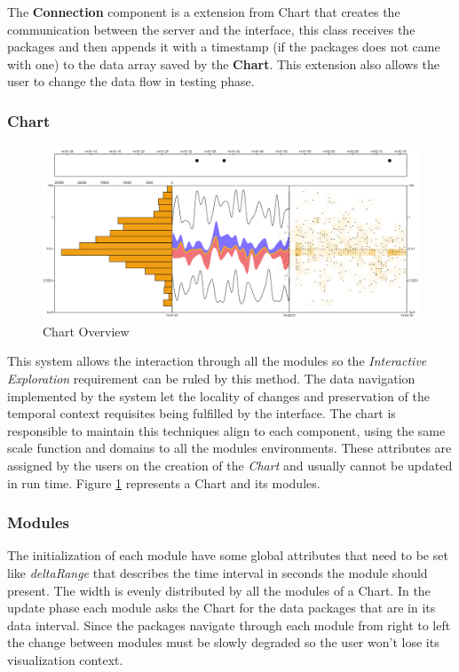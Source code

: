 \documentclass[letterpaper, 10 pt, conference]{ieeeconf}  %
\begin{document}
The \textbf{Connection} component is a extension from Chart that creates the communication between the server and the interface, this class receives the packages and then appends it with a timestamp (if the packages does not came with one) to the data array saved by the \textbf{Chart}. This extension also allows the user to change the data flow in testing phase.



\subsubsection{Chart}
\label{subsubsection:chart}

\begin{figure}[ht]
    \centering
  \includegraphics[width=\linewidth]{Figures/chart.png}
  \caption{Chart Overview}
  \label{fig:chart}
\end{figure}

This system allows the interaction through all the modules so the \textit{Interactive Exploration} requirement can be ruled by this method. The data navigation implemented by the system let the locality of changes and preservation of the temporal context requisites being fulfilled by the interface.\newline
The chart is responsible to maintain this techniques align to each component, using the same scale function and domains to all the modules environments. These attributes are assigned by the users on the creation of the \textit{Chart} and usually cannot be updated in run time. Figure \ref{fig:chart} represents a Chart and its modules.

\subsubsection{Modules}
\label{subsubsection:modules}
The initialization of each module have some global attributes that need to be set like \textit{deltaRange} that describes the time interval in seconds the module should present. The width is evenly distributed by all the modules of a Chart. In the update phase each module asks the Chart for the data packages that are in its data interval. Since the packages navigate through each module from right to left the change between modules must be slowly degraded so the user won't lose its visualization context.
\end{document}
